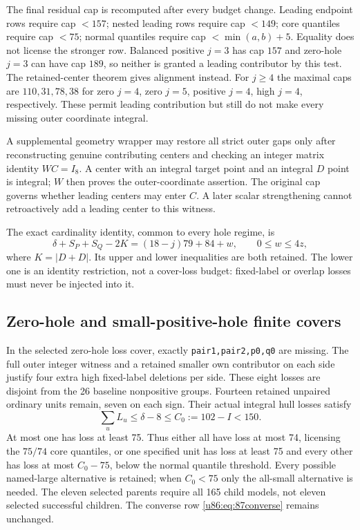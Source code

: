 \documentclass[11pt,a4paper]{article}
\theoremstyle{remark}
\begin{document}
The final residual cap is recomputed after every budget change.
Leading endpoint rows require cap $<157$; nested leading rows require
cap $<149$; core quantiles require cap $<75$; normal quantiles require
cap $<\min(a,b)+5$. Equality does not license the stronger row.
Balanced positive $j=3$ has cap $157$ and zero-hole $j=3$ can have cap
$189$, so neither is granted a leading contributor by this test.
The retained-center theorem gives alignment instead.
For $j\ge4$ the maximal caps are $110,31,78,38$ for zero $j=4$,
zero $j=5$, positive $j=4$, high $j=4$, respectively. These permit
leading contribution but still do not make every missing outer
coordinate integral.

A supplemental geometry wrapper may restore all strict outer gaps
only after reconstructing genuine contributing centers and checking
an integer matrix identity $WC=I_8$. A center with an integral target
point and an integral $D$ point is integral; $W$ then proves the
outer-coordinate assertion. The original cap governs whether leading
centers may enter $C$. A later scalar strengthening cannot
retroactively add a leading center to this witness.

The exact cardinality identity, common to every hole regime, is
\begin{equation}\label{u86:eq:87converse}
 \delta+S_P+S_Q-2K=(18-j)79+84+w,\qquad0\le w\le4z,
\end{equation}
where $K=|D+D|$. Its upper and lower inequalities are both retained.
The lower one is an identity restriction, not a cover-loss budget:
fixed-label or overlap losses must never be injected into it.

\subsection{Zero-hole and small-positive-hole finite covers}
In the selected zero-hole loss cover, exactly
\texttt{pair1,pair2,p0,q0} are missing. The full outer integer witness
and a retained smaller own contributor on each side justify four extra
high fixed-label deletions per side. These eight losses are disjoint
from the 26 baseline nonpositive groups. Fourteen retained unpaired
ordinary units remain, seven on each sign. Their actual integral hull
losses satisfy
\[
 \sum_u L_u\le\delta-8\le C_0:=102-I<150.
\]
At most one has loss at least 75. Thus either all have loss at most 74,
licensing the $75/74$ core quantiles, or one specified unit has loss at
least 75 and every other has loss at most $C_0-75$, below the normal
quantile threshold. Every possible named-large alternative is retained;
when $C_0<75$ only the all-small alternative is needed. The eleven
selected parents require all 165 child models, not eleven selected
successful children. The converse row \eqref{u86:eq:87converse} remains
unchanged.
\end{document}

